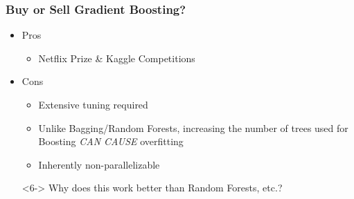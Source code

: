 \documentclass[xcolor={dvipsnames}]{beamer}
\begin{document}
\frame
{
 \frametitle{Buy or Sell Gradient Boosting?}

\begin{itemize}
\item<1-> Pros
\begin{itemize}
\item<2-> Netflix Prize \& Kaggle Competitions
\end{itemize}
\item<1-> Cons
\begin{itemize}
\item<3-> Extensive tuning required
\item<4->[] Unlike Bagging/Random Forests, increasing the number of trees used for Boosting  \emph{CAN CAUSE} overfitting 
\item<5-> Inherently non-parallelizable 
\end{itemize}
\item[]
\item[] 
\item[]
\item[]<6-> Why does this work better than Random Forests, etc.?
\end{itemize}


}
\end{document}
